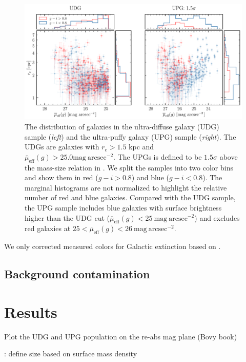 \documentclass[twocolumn,astrosymb,twocolappendix]{aastex631}
\newcommand{\sbunit}{\mathrm{mag\ arcsec}^{-2}}
\newcommand{\sbeff}{\overline{\mu}_{\mathrm{eff}}(g)}
\begin{document}
\begin{CJK*}{UTF8}{gbsn}
\begin{figure}
	\vbox{ 
		\centering
		\includegraphics[width=1\linewidth]{udg_upg_sample.pdf}
	}
    \caption{The distribution of galaxies in the ultra-diffuse galaxy (UDG) sample (\textit{left}) and the ultra-puffy galaxy (UPG) sample (\textit{right}). The UDGs are galaxies with $r_e>1.5$ kpc and $\sbeff > 25.0\sbunit$. The UPGs is defined to be $1.5\sigma$ above the mass-size relation in \citet{ELVES-I}. We split the samples into two color bins and show them in red ($g-i>0.8$) and blue ($g-i<0.8$). The marginal histograms are not normalized to highlight the relative number of red and blue galaxies. Compared with the UDG sample, the UPG sample includes blue galaxies with surface brightness higher than the UDG cut ($\sbeff < 25\ \sbunit$) and excludes red galaxies at $25 < \sbeff < 26\ \sbunit$.
    }
    \label{fig:udg_upg_re_mu}
\end{figure}


\vspace{1em}




We only corrected measured colors for Galactic extinction based on \citet{SFD1998,Schlafly2011}. 


\subsection{Background contamination}


\section{Results}

Plot the UDG and UPG population on the re-abs mag plane (Bovy book)

\citet{Trujillo2020}: define size based on surface mass density



\end{CJK*}
\end{document}
